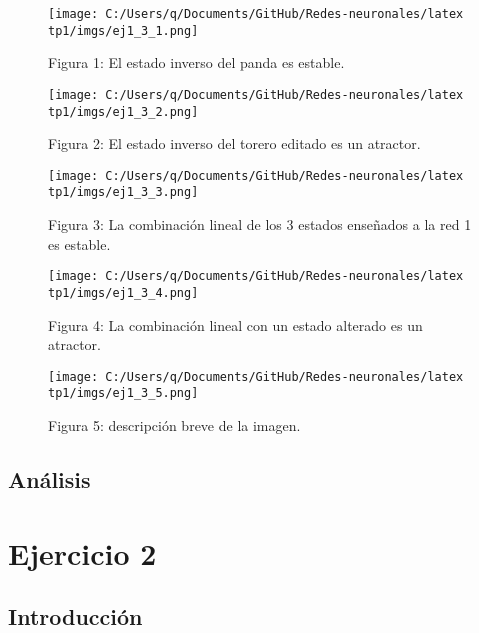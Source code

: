 \documentclass[11pt]{article} %
\begin{document}
\begin{figure}[h!]
    \centering
    \texttt{[image: C:/Users/q/Documents/GitHub/Redes-neuronales/latex tp1/imgs/ej1\_3\_1.png]}
    \caption{Figura 1: El estado inverso del panda es estable.}
    \label{fig:ej1_3_1}
\end{figure}

\begin{figure}[h!]
    \centering
    \texttt{[image: C:/Users/q/Documents/GitHub/Redes-neuronales/latex tp1/imgs/ej1\_3\_2.png]}
    \caption{Figura 2: El estado inverso del torero editado es un atractor.}
    \label{fig:ej1_3_2}
\end{figure}

\begin{figure}[h!]
    \centering
    \texttt{[image: C:/Users/q/Documents/GitHub/Redes-neuronales/latex tp1/imgs/ej1\_3\_3.png]}
    \caption{Figura 3: La combinación lineal de los 3 estados enseñados a la red 1 es estable.}
    \label{fig:ej1_3_3}
\end{figure}

\begin{figure}[h!]
    \centering
    \texttt{[image: C:/Users/q/Documents/GitHub/Redes-neuronales/latex tp1/imgs/ej1\_3\_4.png]}
    \caption{Figura 4: La combinación lineal con un estado alterado es un atractor.}
    \label{fig:ej1_3_4}
\end{figure}

\begin{figure}[h!]
    \centering
    \texttt{[image: C:/Users/q/Documents/GitHub/Redes-neuronales/latex tp1/imgs/ej1\_3\_5.png]}
    \caption{Figura 5: descripción breve de la imagen.}
    \label{fig:ej1_3_5}
\end{figure}
\clearpage

\newpage




\clearpage
\newpage

\subsection{Análisis}

\section{Ejercicio 2}

\subsection{Introducción}
\end{document}
